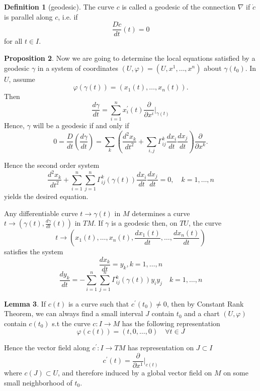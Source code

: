 \documentclass[12pt,a4paper]{book}
\newcommand{\p}{^{\prime}}
\theoremstyle{definition}
\newtheorem{defn}{Definition}[section]
\newtheorem{lem}[defn]{Lemma}
\newtheorem{prop}[defn]{Proposition}
\begin{document}
\begin{defn}[geodesic]
    The curve $c$ is called a geodesic of the connection $\nabla$ if $\dot{c}$ is parallel along $c$, i.e. if
    $$
        \frac{D \dot{c}}{d t}(t)=0
    $$
    for all $t \in I$.
\end{defn}
\begin{prop}
    Now we are going to determine the local equations satisfied by a geodesic $\gamma$ in a system of coordinates $(U, \varphi)=(U, x^1,\dots,x^n)$ about $\gamma\left(t_0\right)$.
    In $U$, assume
    $$
        \varphi(\gamma(t))=\left(x_1(t), \ldots, x_n(t)\right) .
    $$
    Then
    \begin{equation*}
        \frac{d \gamma}{d t}=\sum_{i=1}^n x_i\p(t)\frac{\partial}{\partial x^i}\bigg|_{\gamma(t)}
    \end{equation*}
    Hence, $\gamma$ will be a geodesic if and only if
    $$
        0=\frac{D}{d t}\left(\frac{d \gamma}{d t}\right)=\sum_k\left(\frac{d^2 x_k}{d t^2}+\sum_{i, j} \Gamma_{i j}^k \frac{d x_i}{d t} \frac{d x_j}{d t}\right) \frac{\partial}{\partial x^k} .
    $$

    Hence the second order system
    $$
        \frac{d^2 x_k}{d t^2}+\sum_{i=1}^n \sum_{j=1}^n\Gamma_{i j}^k(\gamma(t)) \frac{d x_i}{d t} \frac{d x_j}{d t}=0, \quad k=1, \ldots, n
    $$
    yields the desired equation.

    Any differentiable curve $t \rightarrow \gamma(t)$ in $M$ determines a curve $t \rightarrow\left(\gamma(t), \frac{d \gamma}{d t}(t)\right)$ in $T M$. If $\gamma$ is a geodesic then, on $T U$, the curve
    $$
        t \rightarrow\left(x_1(t), \ldots, x_n(t), \frac{d x_1(t)}{d t}, \ldots, \frac{d x_n(t)}{d t}\right)
    $$
    satisfies the system
    \begin{equation*}
        \frac{d x_k}{d t}=y_k, k=1,\dots,n
    \end{equation*}\begin{equation*}
        \frac{d y_k}{d t}=-\sum_{i=1}^n\sum_{j=1}^n \Gamma_{i j}^k(\gamma(t))  y_i y_j \quad k=1, \ldots, n
    \end{equation*}
    \label{proposition: local form of geodesic}
\end{prop}
\begin{lem}
    If $c(t)$ is a curve such that $c^{\prime}(t_0)\neq 0$, then by Constant Rank Theorem, we can always find a small interval $J$ contain $t_0$ and a chart $(U, \varphi)$ contain $c\left(t_0\right)$ s.t the curve $c: I \rightarrow M$ has the following representation
    $$
        \varphi(c(t))=(t, 0, \ldots, 0) \quad \forall t \in J
    $$

    Hence the vector field along $c^{\prime}: I \rightarrow T M$ has representation on $J \subset I$
    $$
        c^{\prime}(t)=\frac{\partial}{\partial x^1}\bigg|_{c(t)}
    $$
    where $c(J) \subset U$, and therefore induced by a global vector field on $M$ on some small neighborhood of $t_0$.
    \label{lemma:non-singular curve der induced by global vector field}
\end{lem}
\end{document}
